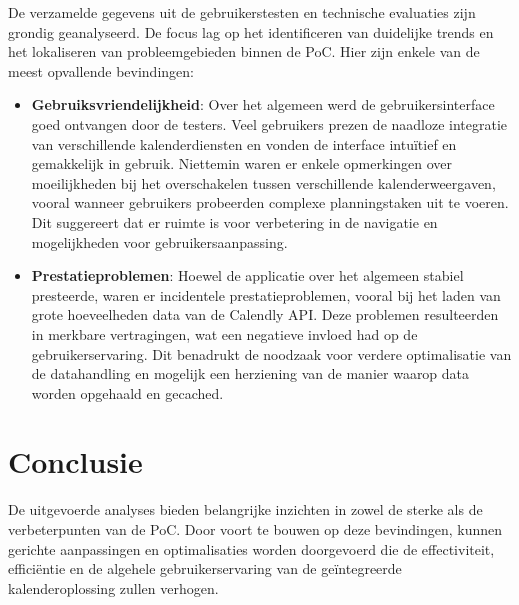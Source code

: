 De verzamelde gegevens uit de gebruikerstesten en technische evaluaties zijn grondig geanalyseerd. De focus lag op het identificeren van duidelijke trends en het lokaliseren van probleemgebieden binnen de PoC. Hier zijn enkele van de meest opvallende bevindingen:

\begin{itemize}
    \item \textbf{Gebruiksvriendelijkheid}: Over het algemeen werd de gebruikersinterface goed ontvangen door de testers. Veel gebruikers prezen de naadloze integratie van verschillende kalenderdiensten en vonden de interface intuïtief en gemakkelijk in gebruik. Niettemin waren er enkele opmerkingen over moeilijkheden bij het overschakelen tussen verschillende kalenderweergaven, vooral wanneer gebruikers probeerden complexe planningstaken uit te voeren. Dit suggereert dat er ruimte is voor verbetering in de navigatie en mogelijkheden voor gebruikersaanpassing.
    \item \textbf{Prestatieproblemen}: Hoewel de applicatie over het algemeen stabiel presteerde, waren er incidentele prestatieproblemen, vooral bij het laden van grote hoeveelheden data van de Calendly API. Deze problemen resulteerden in merkbare vertragingen, wat een negatieve invloed had op de gebruikerservaring. Dit benadrukt de noodzaak voor verdere optimalisatie van de datahandling en mogelijk een herziening van de manier waarop data worden opgehaald en gecached.
\end{itemize}

\section{Conclusie}

De uitgevoerde analyses bieden belangrijke inzichten in zowel de sterke als de verbeterpunten van de PoC. Door voort te bouwen op deze bevindingen, kunnen gerichte aanpassingen en optimalisaties worden doorgevoerd die de effectiviteit, efficiëntie en de algehele gebruikerservaring van de geïntegreerde kalenderoplossing zullen verhogen.
